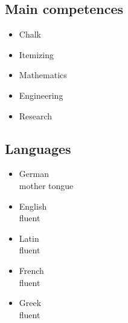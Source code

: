 \documentclass[a4paper]{article}
\newenvironment{ITEMIZE}{\vspace{-\topsep}\begin{itemize}}{\end{itemize}}
\begin{document}
\subsection*{Main competences}
\begin{ITEMIZE}
  \item%
  Chalk
  \item%
  Itemizing
  \item%
  Mathematics
  \item%
  Engineering
  \item%
  Research
\end{ITEMIZE}
\subsection*{Languages}
\begin{ITEMIZE}
  \item%
  German\\
  mother tongue
  \item%
  English\\
  fluent
  \item%
  Latin\\
  fluent
  \item%
  French\\
  fluent
  \item%
  Greek\\
  fluent
\end{ITEMIZE}
\end{document}
